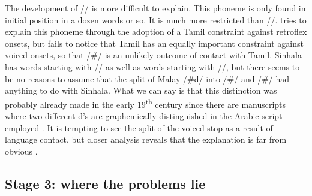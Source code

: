 The development of /\dentd/ is more difficult to explain. This phoneme is only found in initial position in a dozen words or so. It is much more restricted than /\tz/. \citet{Smith2003timing} tries to explain this phoneme through the adoption of a Tamil constraint against retroflex onsets, but fails to notice that Tamil has an equally important constraint against voiced onsets, so that /\#\dentd/ is an unlikely outcome of contact with Tamil. Sinhala has words starting with /\dentd/ as well as words starting with /\dz/, but there seems to be no reasons to assume that the split of Malay /\#d/ into /\#\dentd/ and /\#\dz/ had anything to do with Sinhala. What we can say is that this distinction was probably already made in the early 19\textsuperscript{th} century  since there are manuscripts where two different d's are graphemically distinguished	in the Arabic script employed \citep{Hussainmiya1987}. It is tempting to see the split of the voiced stop as a result of language contact, but closer analysis reveals that the explanation is far from obvious \citep{Smith2012jlc,Nordhoff2012jlcsmith}.



\subsection{Stage 3: where the problems lie}\label{sec:disc:stage3}

